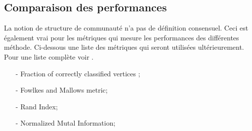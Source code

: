 \subsection{Comparaison des performances}
La notion de structure de communauté n'a pas de définition consensuel.
Ceci est également vrai pour les métriques qui mesure les performances des différentes méthode.
Ci-dessous une liste des métriques qui seront utilisées ultérieurement.
Pour une liste complète voir \cite[p.77-79]{Community_detection_in_graphs}.
\begin{itemize}
	\item[-] Fraction of correctly classified vertices ; 
	\item[-] Fowlkes and Mallows metric; 
	\item[-] Rand Index; 
	\item[-] Normalized Mutal Information; 
\end{itemize}